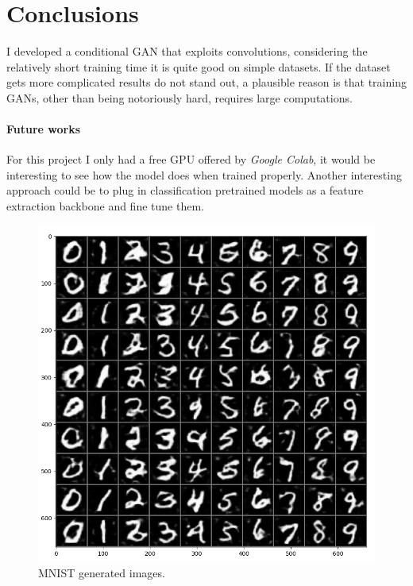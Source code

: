 \documentclass[10pt,twocolumn,letterpaper]{article}
\begin{document}
\section{Conclusions}
I developed a conditional GAN that exploits convolutions, considering the relatively short training time it is quite good on simple datasets.
If the dataset gets more complicated results do not stand out, a plausible reason is that training GANs, other than being notoriously hard, requires large computations.

\paragraph{Future works} For this project I only had a free GPU offered by \textit{Google Colab}, it would be interesting to see how the model does when trained properly.
Another interesting approach could be to plug in classification pretrained models as a feature extraction backbone and fine tune them.

\begin{figure}
   \centering
   \includegraphics[scale=0.4]{images/mnist.png}
   \caption{MNIST generated images.}
   \label{fig:mnist}
\end{figure}
\end{document}
